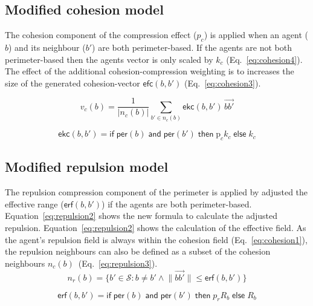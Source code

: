 \documentclass[12pt,a4paper]{IEEEtran}
\begin{document}
\subsection{Modified cohesion model}
The cohesion component of the compression effect ($p_c$) is applied when an agent ($b$) and its neighbour ($b'$) are both perimeter-based. If the agents are not both perimeter-based then the agents vector is only scaled by $k_c$ (Eq.~\ref{eq:cohesion4}). The effect of the additional cohesion-compression weighting is to increases the size of the generated cohesion-vector $\mathsf{efc}(b,b')$ (Eq.~\ref{eq:cohesion3}). 

\begin{equation}\label{eq:cohesion3}
v_c(b) = \frac{1}{\lvert n_c(b)\rvert} \sum_{b' \in n_c(b)}\mathsf{ekc}(b, b')\, \vec{b b'}
\end{equation}

\small
\begin{equation}\label{eq:cohesion4}
\mathsf{ekc}(b, b') = \mathsf{if} \; \mathsf{per}(b) \; \mathsf{and} \; \mathsf{per}(b') \; \mathsf{then} \; \mathrm{p}_ck_c \; \mathsf{else} \; k_c
\end{equation}
\normalsize

\subsection{Modified repulsion model}\label{repulsion:compression}
The repulsion compression component of the perimeter is applied by adjusted the effective range ($\mathsf{erf}(b,b')$) if the agents are both perimeter-based. Equation~\ref{eq:repulsion2} shows the new formula to calculate the adjusted repulsion. Equation~\ref{eq:repulsion2} shows the calculation of the effective field. As the agent's repulsion field is always within the cohesion field (Eq.~\ref{eq:cohesion1}), the repulsion neighbours can also be defined as a subset of the cohesion neighbours $n_c(b)$~(Eq.~\ref{eq:repulsion3}).\\

\begin{equation}\label{eq:repulsion1}
n_r(b) = \{b' \in \mathcal{S} : b \neq b' \land \lVert\vec{b b'}\rVert \leq \mathsf{erf}(b,b')\}
\end{equation}

\small
\begin{equation}\label{eq:repulsion2}
\mathsf{erf}(b, b') = \mathsf{if} \;
\mathsf{per}(b) \; \mathsf{and} \; \mathsf{per}(b') \; \mathsf{then} \;
p_rR_b \; \mathsf{else} \; R_b
\end{equation}
\normalsize
\end{document}
